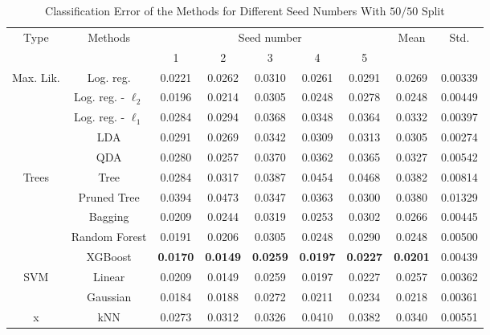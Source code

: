 \begin{table}[htb]
	\caption{Classification Error of the Methods for Different Seed Numbers With $50/50$ Split}
	\begin{center}
		\begin{tabular}{@{} c c c  c c c c c c@{}}\toprule
			\multirow{2}{*}{Type} & \multirow{2}{*}{Methods} &  \multicolumn{5}{c}{Seed number}
			& 	\multirow{2}{*}{Mean} & \multirow{2}{*}{Std.} \\
			& & 1 & 2 & 3 & 4 & 5 & & \\
			\midrule
			\multirow{5}{*}{Max. Lik.} & Log. reg. & \num{0.0221} & \num{0.0262} & \num{0.0310} & \num{0.0261} & \num{0.0291} & \num{0.0269} & \num{0.00339} \\
			& Log. reg. - $\ell_2$ & \num{0.0196} & \num{0.0214} & \num{0.0305} & \num{0.0248} & \num{0.0278} & \num{0.0248} & \num{0.00449}\\
			& Log. reg. - $\ell_1$ & \num{0.0284} & \num{0.0294} & \num{0.0368} & \num{0.0348} & \num{0.0364} & \num{0.0332} & \num{0.00397}\\
			& LDA & \num{0.0291} & \num{0.0269} & \num{0.0342} & \num{0.0309} & \num{0.0313} & \num{0.0305} & \num{0.00274}\\
			& QDA & \num{0.0280} & \num{0.0257} & \num{0.0370} & \num{0.0362} & \num{0.0365} & \num{0.0327} & \num{0.00542}\\
			\cmidrule{1-9}
			\multirow{5}{*}{Trees} & Tree & \num{0.0284} & \num{0.0317} & \num{0.0387} & \num{0.0454} & \num{0.0468} & \num{0.0382} & \num{0.00814}\\
			& Pruned Tree & \num{0.0394} & \num{0.0473} & \num{0.0347} & \num{0.0363} & \num{0.0300} & \num{0.0380} & \num{0.01329}\\  
			& Bagging & \num{0.0209} & \num{0.0244} & \num{0.0319} & \num{0.0253} & \num{0.0302} & \num{0.0266} & \num{0.00445}\\
			& Random Forest & \num{0.0191} & \num{0.0206} & \num{0.0305} & \num{0.0248} & \num{0.0290} & \num{0.0248} & \num{0.00500}\\
			& XGBoost & \textbf{\num{0.0170}} & \textbf{\num{0.0149}} & \textbf{\num{0.0259}} & \textbf{\num{0.0197}} & \textbf{\num{0.0227}} & \textbf{\num{0.0201}} & \num{0.00439}\\
			\cmidrule{1-9}
			\multirow{2}{*}{SVM} & Linear & \num{0.0209} & \num{0.0149} & \num{0.0259} & \num{0.0197} & \num{0.0227} & \num{0.0257} & \num{0.00362}\\
			& Gaussian & \num{0.0184} & \num{0.0188} & \num{0.0272} & \num{0.0211} & \num{0.0234} & \num{0.0218} & \num{0.00361}\\
			\cmidrule{1-9}
			x & kNN & \num{0.0273} & \num{0.0312} & \num{0.0326} & \num{0.0410} & \num{0.0382} & \num{0.0340} & \num{0.00551} \\
			\bottomrule
		\end{tabular}
	\end{center}
	\label{tab_res_our_strategy}
\end{table}

